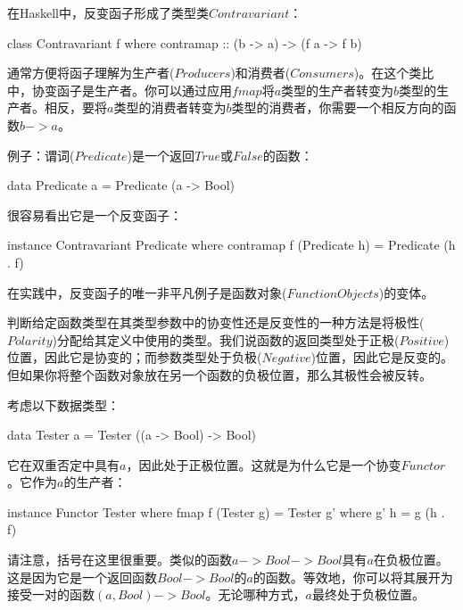 \documentclass[DaoFP]{subfiles}
\begin{document}
    在Haskell中，反变函子形成了类型类$Contravariant$：

    \begin{haskell}
        class Contravariant f where
        contramap :: (b -> a) -> (f a -> f b)
    \end{haskell}

    通常方便将函子理解为生产者($Producers$)和消费者($Consumers$)。在这个类比中，协变函子是生产者。你可以通过应用$fmap$将$a$类型的生产者转变为$b$类型的生产者。相反，要将$a$类型的消费者转变为$b$类型的消费者，你需要一个相反方向的函数$b -> a$。

    例子：谓词($Predicate$)是一个返回$True$或$False$的函数：

    \begin{haskell}
        data Predicate a = Predicate (a -> Bool)
    \end{haskell}

    很容易看出它是一个反变函子：

    \begin{haskell}
        instance Contravariant Predicate where
        contramap f (Predicate h) = Predicate (h . f)
    \end{haskell}

    在实践中，反变函子的唯一非平凡例子是函数对象($Function Objects$)的变体。

    判断给定函数类型在其类型参数中的协变性还是反变性的一种方法是将极性($Polarity$)分配给其定义中使用的类型。我们说函数的返回类型处于正极($Positive$)位置，因此它是协变的；而参数类型处于负极($Negative$)位置，因此它是反变的。但如果你将整个函数对象放在另一个函数的负极位置，那么其极性会被反转。

    考虑以下数据类型：

    \begin{haskell}
        data Tester a = Tester ((a -> Bool) -> Bool)
    \end{haskell}

    它在双重否定中具有$a$，因此处于正极位置。这就是为什么它是一个协变$Functor$。它作为$a$的生产者：

    \begin{haskell}
        instance Functor Tester where
        fmap f (Tester g) = Tester g'
        where g' h = g (h . f)
    \end{haskell}

    请注意，括号在这里很重要。类似的函数$a -> Bool -> Bool$具有$a$在负极位置。这是因为它是一个返回函数$Bool -> Bool$的$a$的函数。等效地，你可以将其展开为接受一对的函数$(a, Bool) -> Bool$。无论哪种方式，$a$最终处于负极位置。
\end{document}
